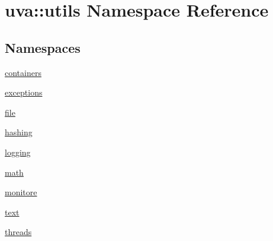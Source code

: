 \hypertarget{namespaceuva_1_1utils}{}\section{uva\+:\+:utils Namespace Reference}
\label{namespaceuva_1_1utils}
\subsection*{Namespaces}
\begin{DoxyCompactItemize}
\item 
 \hyperlink{namespaceuva_1_1utils_1_1containers}{containers}
\item 
 \hyperlink{namespaceuva_1_1utils_1_1exceptions}{exceptions}
\item 
 \hyperlink{namespaceuva_1_1utils_1_1file}{file}
\item 
 \hyperlink{namespaceuva_1_1utils_1_1hashing}{hashing}
\item 
 \hyperlink{namespaceuva_1_1utils_1_1logging}{logging}
\item 
 \hyperlink{namespaceuva_1_1utils_1_1math}{math}
\item 
 \hyperlink{namespaceuva_1_1utils_1_1monitore}{monitore}
\item 
 \hyperlink{namespaceuva_1_1utils_1_1text}{text}
\item 
 \hyperlink{namespaceuva_1_1utils_1_1threads}{threads}
\end{DoxyCompactItemize}

